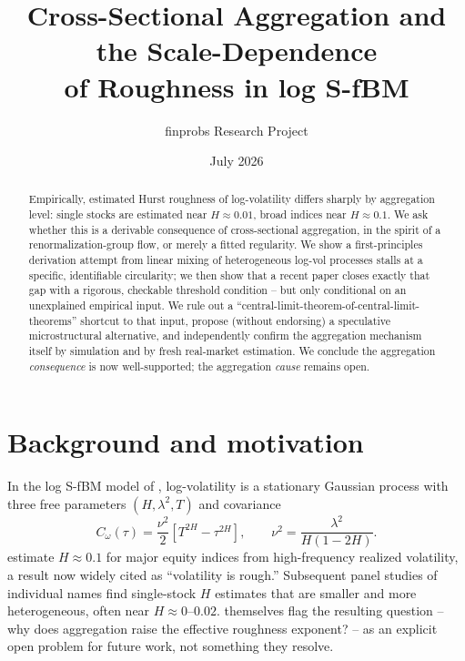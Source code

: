 \documentclass[11pt]{article}
\title{Cross-Sectional Aggregation and the Scale-Dependence\\ of Roughness in log S-fBM}
\author{finprobs Research Project}
\date{July 2026}
\begin{document}
\maketitle

\begin{abstract}
Empirically, estimated Hurst roughness of log-volatility differs sharply by aggregation level: single stocks are estimated near $H\approx0.01$, broad indices near $H\approx0.1$. We ask whether this is a derivable consequence of cross-sectional aggregation, in the spirit of a renormalization-group flow, or merely a fitted regularity. We show a first-principles derivation attempt from linear mixing of heterogeneous log-vol processes stalls at a specific, identifiable circularity; we then show that a recent paper closes exactly that gap with a rigorous, checkable threshold condition -- but only conditional on an unexplained empirical input. We rule out a ``central-limit-theorem-of-central-limit-theorems'' shortcut to that input, propose (without endorsing) a speculative microstructural alternative, and independently confirm the aggregation mechanism itself by simulation and by fresh real-market estimation. We conclude the aggregation \emph{consequence} is now well-supported; the aggregation \emph{cause} remains open.
\end{abstract}

\section{Background and motivation}

In the log S-fBM model of \citet{wu2022rough}, log-volatility is a stationary Gaussian process with three free parameters $(H,\lambda^2,T)$ and covariance
\begin{equation}
C_\omega(\tau) = \frac{\nu^2}{2}\left[T^{2H}-\tau^{2H}\right], \qquad \nu^2 = \frac{\lambda^2}{H(1-2H)}. \label{eq:cov}
\end{equation}
\citet{gatheral2018volatility} estimate $H\approx0.1$ for major equity indices from high-frequency realized volatility, a result now widely cited as ``volatility is rough.'' Subsequent panel studies of individual names \citep{bennedsen2022decoupling,bolko2023gmm} find single-stock $H$ estimates that are smaller and more heterogeneous, often near $H\approx0$--$0.02$. \citet{wu2022rough} themselves flag the resulting question -- why does aggregation raise the effective roughness exponent? -- as an explicit open problem for future work, not something they resolve.
\end{document}
